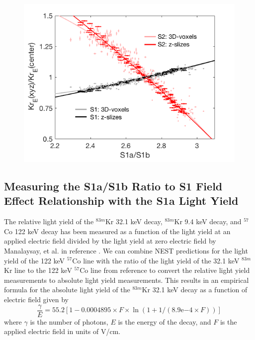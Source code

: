 \begin{figure}
\includegraphics[scale=0.4]{figures/S1aS1bvField_ZDep_3D.png}
 \label{fig:S1FieldFig}
\end{figure}

\subsection{Measuring the S1a/S1b Ratio to S1 Field Effect Relationship with the S1a Light Yield} \label{MatthewsIdea}

The relative light yield of the $^{83m}$Kr 32.1 keV decay, $^{83m}$Kr 9.4 keV decay, and $^{57}$Co 122 keV decay has been measured as a function of the light yield at an applied electric field divided by the light yield at zero electric field by Manalaysay, et al. in reference \cite{Manalaysay}.  We can combine NEST predictions for the light yield of the 122 keV $^{57}$Co line with the ratio of the light yield of the 32.1 keV $^{83m}$Kr line to the 122 keV $^{57}$Co line from reference \cite{Manalaysay} to convert the relative light yield measurements to absolute light yield measurements.  This results in an empirical formula for the absolute light yield of the $^{83m}$Kr 32.1 keV decay as a function of electric field given by
\begin{equation}
\frac{\gamma}{E} = 55.2[1-0.0004895 \times F \times \ln{(1 + 1/(8.9\mathrm{e}{-4} \times F))}]
\label{S1aYield}
\end{equation}
where $\gamma$ is the number of photons, $E$ is the energy of the decay, and $F$ is the applied electric field in units of V/cm.  

